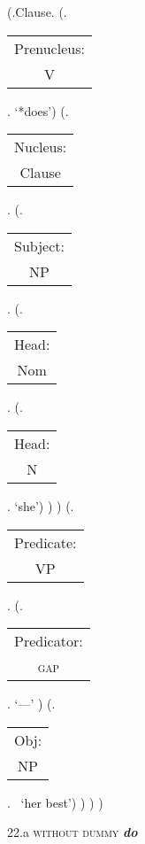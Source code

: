 \documentclass[12pt,letterpaper]{article}
\begin{document}
\begin{figure}
	\begin{center}
		\begin{parsetree}
			(.Clause.
			(.\begin{tabular}{c}Prenucleus:\\V\end{tabular}. `*does')
			(.\begin{tabular}{c}Nucleus:\\Clause\end{tabular}.    
			(.\begin{tabular}{c}Subject:\\NP\end{tabular}.  
			(.\begin{tabular}{c}Head:\\Nom\end{tabular}.
			(.\begin{tabular}{c}Head:\\N\end{tabular}. `she')
			)
			)
			(.\begin{tabular}{c}Predicate:\\VP\end{tabular}.
			(.\begin{tabular}{c}Predicator:\\\textsc{gap}\end{tabular}. `---' )
			(.\begin{tabular}{c}Obj:\\NP\end{tabular}.  ~`her best')
			)
			)
			)
			
		\end{parsetree}
		\hfill \break \hfill \break
		22.a \textsc{without dummy} \textit{\textbf{do}}
	\end{center}
\end{figure}
\end{document}
